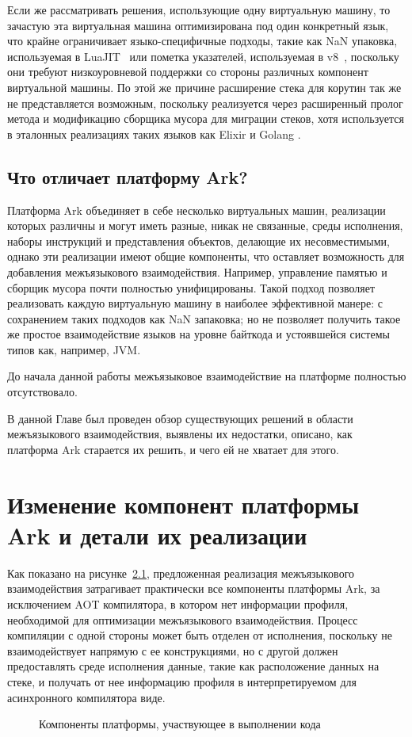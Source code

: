 \documentclass[times
]{itmo-student-thesis}
\begin{document}
Если же рассматривать решения, использующие одну виртуальную машину, то зачастую эта виртуальная машина оптимизирована под один конкретный язык, что крайне ограничивает языко-специфичные подходы, такие как NaN упаковка, используемая в LuaJIT~\cite{luajit-nan-box} или пометка указателей, используемая в v8~\cite{v8-pointer-tagging}, поскольку они требуют низкоуровневой поддержки со стороны различных компонент виртуальной машины. По этой же причине расширение стека для корутин так же не представляется возможным, поскольку реализуется через расширенный пролог метода и модификацию сборщика мусора для миграции стеков, хотя используется в эталонных реализациях таких языков как Elixir и Golang \cite{golang-stack}.

\finishrelatedwork

\section{Что отличает платформу Ark?}\label{ch:ark-good}
Платформа Ark объединяет в себе несколько виртуальных машин, реализации которых различны и могут иметь разные, никак не связанные, среды исполнения, наборы инструкций и представления объектов, делающие их несовместимыми, однако эти реализации имеют общие компоненты, что оставляет возможность для добавления межъязыкового взаимодействия. Например, управление памятью и сборщик мусора почти полностью унифицированы. Такой подход позволяет реализовать каждую виртуальную машину в наиболее эффективной манере: с сохранением таких подходов как NaN запаковка; но не позволяет получить такое же простое взаимодействие языков на уровне байткода и устоявшейся системы типов как, например, JVM.

До начала данной работы межъязыковое взаимодействие на платформе полностью отсутствовало.

\chapterconclusion
В данной Главе был проведен обзор существующих решений в области межъязыкового взаимодействия, выявлены их недостатки, описано, как платформа Ark старается их решить, и чего ей не хватает для этого.

\chapter{Изменение компонент платформы Ark и детали их реализации}\label{ch:platform}
Как показано на рисунке~\ref{fig:all-components}, предложенная реализация межъязыкового взаимодействия затрагивает практически все компоненты платформы Ark, за исключением AOT компилятора, в котором нет информации профиля, необходимой для оптимизации межъязыкового взаимодействия. Процесс компиляции с одной стороны может быть отделен от исполнения, поскольку не взаимодействует напрямую с ее конструкциями, но с другой должен предоставлять среде исполнения данные, такие как расположение данных на стеке, и получать от нее информацию профиля в интерпретируемом для асинхронного компилятора виде.
\begin{figure}[!h]
	\caption{Компоненты платформы, участвующее в выполнении кода}\label{fig:all-components}
	\centering
	\resizebox{0.55\textwidth}{!}{}
\end{figure}
\end{document}
